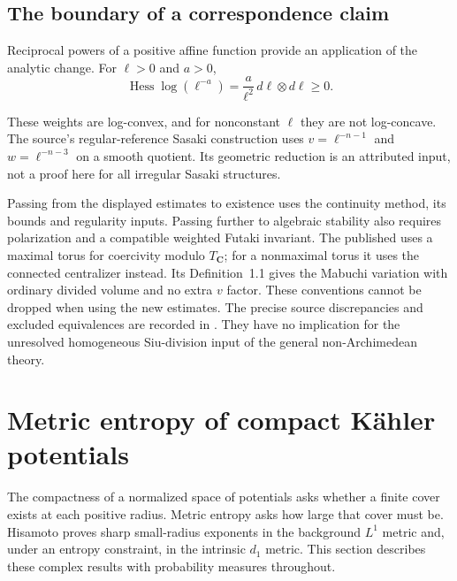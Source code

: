\begin{samepage}
\subsection{The boundary of a correspondence claim}

Reciprocal powers of a positive affine function provide an application
of the analytic change. For $\ell>0$ and $a>0$,
\[
 \operatorname{Hess}\log(\ell^{-a})
       =\frac{a}{\ell^2}\,d\ell\otimes d\ell\geq0.
 \tag{H.119}\label{eq:appH-positive-affine-log-convex}
\]
\end{samepage}
These weights are log-convex, and for nonconstant $\ell$ they are
not log-concave. The source's regular-reference Sasaki construction
uses $v=\ell^{-n-1}$ and $w=\ell^{-n-3}$ on a smooth quotient.
Its geometric reduction is an attributed input, not a proof here for
all irregular Sasaki structures.

Passing from the displayed estimates to existence uses the continuity
method, its bounds and regularity inputs. Passing further to algebraic
stability also requires polarization and a compatible weighted Futaki
invariant. The published
\cite[Theorem~1 and Remark~7.7]{ApostolovJubertLahdili23Published}
uses a maximal torus for coercivity modulo $T_{\mathbf C}$; for a
nonmaximal torus it uses the connected centralizer instead.
Its Definition~1.1 gives the Mabuchi variation with ordinary divided
volume and no extra $v$ factor. These conventions cannot be dropped
when using the new estimates. The precise source discrepancies and
excluded equivalences are recorded in
. They have no implication for
the unresolved homogeneous Siu-division input of the general
non-Archimedean theory.

\section{Metric entropy of compact K\"ahler potentials}
\label{sec:appH-metric-entropy}

The compactness of a normalized space of potentials asks whether a finite
cover exists at each positive radius. Metric entropy asks how large that
cover must be. Hisamoto \cite{Hisamoto26MetricEntropyV1} proves sharp
small-radius exponents in the background $L^1$ metric and, under an
entropy constraint, in the intrinsic $d_1$ metric. This section describes
these complex results with probability measures throughout.

